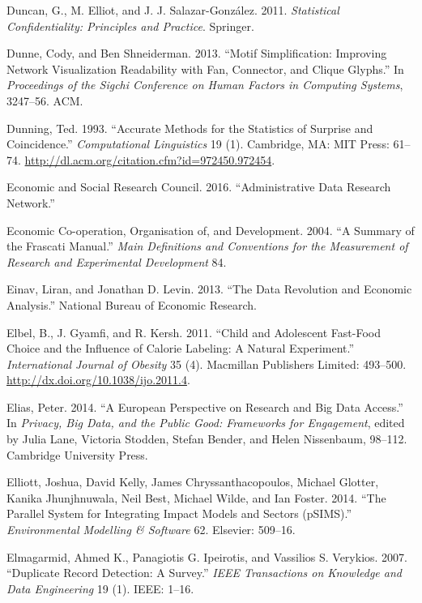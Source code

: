 \documentclass[]{krantz}
\begin{document}
\hypertarget{ref-duncanstatistical}{}
Duncan, G., M. Elliot, and J. J. Salazar-González. 2011.
\emph{Statistical Confidentiality: Principles and Practice}. Springer.

\hypertarget{ref-dunne2013motif}{}
Dunne, Cody, and Ben Shneiderman. 2013. ``Motif Simplification:
Improving Network Visualization Readability with Fan, Connector, and
Clique Glyphs.'' In \emph{Proceedings of the Sigchi Conference on Human
Factors in Computing Systems}, 3247--56. ACM.

\hypertarget{ref-Dunning-93}{}
Dunning, Ted. 1993. ``Accurate Methods for the Statistics of Surprise
and Coincidence.'' \emph{Computational Linguistics} 19 (1). Cambridge,
MA: MIT Press: 61--74.
\url{http://dl.acm.org/citation.cfm?id=972450.972454}.

\hypertarget{ref-EconomicandSocialResearchCouncil2016}{}
Economic and Social Research Council. 2016. ``Administrative Data
Research Network.''

\hypertarget{ref-manual2004summary}{}
Economic Co-operation, Organisation of, and Development. 2004. ``A
Summary of the Frascati Manual.'' \emph{Main Definitions and Conventions
for the Measurement of Research and Experimental Development} 84.

\hypertarget{ref-einav2013data}{}
Einav, Liran, and Jonathan D. Levin. 2013. ``The Data Revolution and
Economic Analysis.'' National Bureau of Economic Research.

\hypertarget{ref-Elbel2011}{}
Elbel, B., J. Gyamfi, and R. Kersh. 2011. ``Child and Adolescent
Fast-Food Choice and the Influence of Calorie Labeling: A Natural
Experiment.'' \emph{International Journal of Obesity} 35 (4). Macmillan
Publishers Limited: 493--500.
\url{http://dx.doi.org/10.1038/ijo.2011.4}.

\hypertarget{ref-Elias2014}{}
Elias, Peter. 2014. ``A European Perspective on Research and Big Data
Access.'' In \emph{Privacy, Big Data, and the Public Good: Frameworks
for Engagement}, edited by Julia Lane, Victoria Stodden, Stefan Bender,
and Helen Nissenbaum, 98--112. Cambridge University Press.

\hypertarget{ref-elliott2014parallel}{}
Elliott, Joshua, David Kelly, James Chryssanthacopoulos, Michael
Glotter, Kanika Jhunjhnuwala, Neil Best, Michael Wilde, and Ian Foster.
2014. ``The Parallel System for Integrating Impact Models and Sectors
(pSIMS).'' \emph{Environmental Modelling \& Software} 62. Elsevier:
509--16.

\hypertarget{ref-elmagarmid2007duplicate}{}
Elmagarmid, Ahmed K., Panagiotis G. Ipeirotis, and Vassilios S.
Verykios. 2007. ``Duplicate Record Detection: A Survey.'' \emph{IEEE
Transactions on Knowledge and Data Engineering} 19 (1). IEEE: 1--16.
\end{document}
